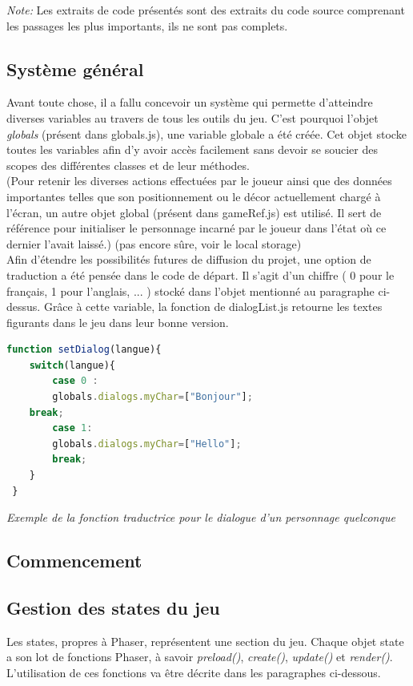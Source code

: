 \documentclass[11pt]{article}
\begin{document}
\begin{appendices}
\textit{Note:} Les extraits de code présentés sont des extraits du code source comprenant les passages les plus importants, ils ne sont pas complets.

\subsection{Système général}
	Avant toute chose, il a fallu concevoir un système qui permette d'atteindre diverses variables au travers de tous les outils du jeu. C'est pourquoi l'objet \textit{globals} (présent dans globals.js), une variable globale a été créée. Cet objet stocke toutes les variables afin d'y avoir accès facilement sans devoir se soucier des scopes des différentes classes et de leur méthodes.\\
	
	
	(Pour retenir les diverses actions effectuées par le joueur ainsi que des données importantes telles que son positionnement ou le décor actuellement chargé à l'écran, un autre objet global (présent dans gameRef.js) est utilisé. Il sert de référence pour initialiser le personnage incarné par le joueur dans l'état où ce dernier l'avait laissé.) (pas encore sûre, voir le local storage)\\
 
 Afin d'étendre les possibilités futures de diffusion du projet, une option de traduction a été pensée dans le code de départ. Il s'agit d'un chiffre ( 0 pour le français, 1 pour l'anglais, ... ) stocké dans l'objet mentionné au paragraphe ci-dessus. Grâce à cette variable, la fonction de dialogList.js retourne les textes figurants dans le jeu dans leur bonne version. \\
 \begin{lstlisting}[language=JavaScript]
 function setDialog(langue){
    switch(langue){
        case 0 : 
        globals.dialogs.myChar=["Bonjour"];
    break;
        case 1:
        globals.dialogs.myChar=["Hello"];
		break;
 	}
 }
\end{lstlisting}
\textit{Exemple de la fonction traductrice pour le dialogue d'un personnage quelconque}
\subsection{Commencement}
\subsection{Gestion des states du jeu}
Les states, propres à Phaser, représentent une section du jeu. Chaque objet state a son lot de fonctions Phaser, à savoir \textit{preload()}, \textit{create()}, \textit{update()} et \textit{render()}. L'utilisation de ces fonctions va être décrite dans les paragraphes ci-dessous.


\end{appendices}
\end{document}
